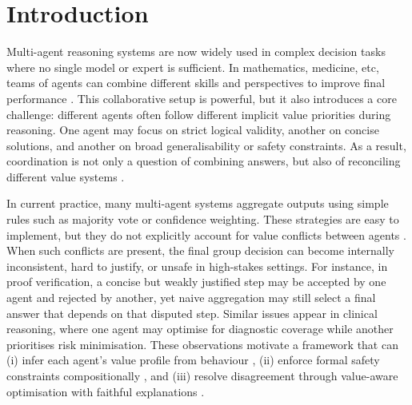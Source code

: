 \documentclass[12pt,a4paper]{article}
\begin{document}
\newpage
\tableofcontents
\newpage



\section{Introduction}
\label{sec:intro}


Multi-agent reasoning systems are now widely used in complex decision tasks where no
single model or expert is sufficient. In mathematics, medicine, etc, teams of agents can combine different skills and perspectives to improve final
performance \citep{du2023improving}. This
collaborative setup is powerful, but it also introduces a core challenge: different
agents often follow different implicit value priorities during reasoning. One agent may
focus on strict logical validity, another on concise solutions, and another on broad
generalisability or safety constraints. As a result, coordination is not only a question
of combining answers, but also of reconciling different value systems
\citep{informed2025voting,li2025nucleolus}.


In current practice, many multi-agent systems aggregate outputs using simple rules such as
majority vote or confidence weighting. These strategies are easy to implement, but they do
not explicitly account for value conflicts between agents \citep{informed2025voting}. When such conflicts are present, the final group decision can
become internally inconsistent, hard to justify, or unsafe in high-stakes settings. For
instance, in proof verification, a concise but weakly justified step may be accepted by one
agent and rejected by another, yet naive aggregation may still select a final answer that
depends on that disputed step. Similar issues appear in clinical reasoning, where one agent
may optimise for diagnostic coverage while another prioritises risk minimisation. These observations motivate a framework that can
(i) infer each agent’s value profile from behaviour \citep{ng2000algorithms,
ziebart2008maximum,wulfmeier2015maximum}, (ii) enforce formal safety constraints
compositionally \citep{brorholt2025compositional,moura2021lean4}, and (iii) resolve
disagreement through value-aware optimisation with faithful explanations
\citep{li2025nucleolus,frimpong2026grmadrl,pearl2009causality}.
\end{document}
